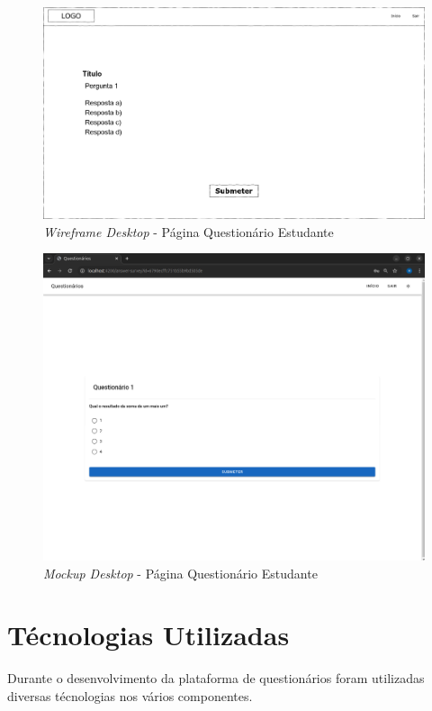 \documentclass[12pt,a4paper,final]{article}
\begin{document}
    \begin{figure}[H]
        \centering
        \includegraphics[width=\textwidth,height=0.9\textheight,keepaspectratio]{wireframes/questionarios.wireframes-estudante-questionario-desktop.drawio}
        \caption{\textit{Wireframe Desktop} - Página Questionário Estudante}
        \label{fig:wd-pqe}
    \end{figure}

    \begin{figure}[H]
        \centering
        \includegraphics[width=\textwidth,height=0.9\textheight,keepaspectratio]{mockups/questionarios.wireframes-estudante-questionario-desktop}
        \caption{\textit{Mockup Desktop} - Página Questionário Estudante}
        \label{fig:md-pqe}
    \end{figure}


    \section{Técnologias Utilizadas}\label{sec:tecnologias}
    Durante o desenvolvimento da plataforma de questionários foram utilizadas diversas técnologias nos vários componentes.
\end{document}
